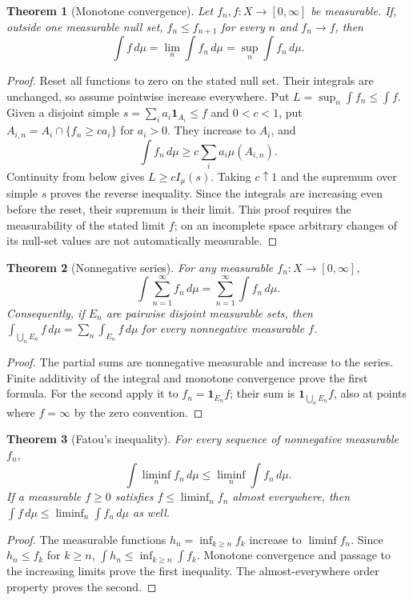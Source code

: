 \documentclass[11pt,oneside,openany]{book}
\newtheorem{theorem}{Theorem}[chapter]
\theoremstyle{definition}
\theoremstyle{remark}
\newcommand{\one}{\mathbf1}\newcommand{\ind}[1]{\mathbf1_{#1}}
\newcommand{\Eplus}{[0,\infty]}
\newcommand{\family}[1]{}
\begin{document}
\begin{theorem}[Monotone convergence]
\family{D11.05.monotone_convergence}\label{d11:05:monotone-convergence}
Let $f_n,f:X\to\Eplus$ be measurable. If, outside one measurable null
set, $f_n\leq f_{n+1}$ for every $n$ and $f_n\to f$, then
\[
 \int f\,d\mu=\lim_n\int f_n\,d\mu=\sup_n\int f_n\,d\mu.
\]
\end{theorem}
\begin{proof}
Reset all functions to zero on the stated null set. Their integrals are
unchanged, so assume pointwise increase everywhere. Put
$L=\sup_n\int f_n\leq\int f$. Given a disjoint simple
$s=\sum_i a_i\one_{A_i}\leq f$ and $0<c<1$, put
$A_{i,n}=A_i\cap\{f_n\geq ca_i\}$ for $a_i>0$.
They increase to $A_i$, and
\[
 \int f_n\,d\mu\geq c\sum_i a_i\mu(A_{i,n}).
\]
Continuity from below gives $L\geq cI_\mu(s)$. Taking $c\uparrow1$ and
the supremum over simple $s$ proves the reverse inequality. Since the
integrals are increasing even before the reset, their supremum is their
limit. This proof requires the measurability of the stated limit $f$;
on an incomplete space arbitrary changes of its null-set values are not
automatically measurable.
\end{proof}

\begin{theorem}[Nonnegative series]
\family{D11.05.beppo_levi}\label{d11:05:beppo-levi}
For any measurable $f_n:X\to\Eplus$,
\[
 \int\sum_{n=1}^\infty f_n\,d\mu
   =\sum_{n=1}^\infty\int f_n\,d\mu.
\]
Consequently, if $E_n$ are pairwise disjoint measurable sets, then
$\int_{\bigcup_nE_n}f\,d\mu=\sum_n\int_{E_n}f\,d\mu$ for every
nonnegative measurable $f$.
\end{theorem}
\begin{proof}
The partial sums are nonnegative measurable and increase to the series.
Finite additivity of the integral and monotone convergence prove the first
formula. For the second apply it to $f_n=\one_{E_n}f$; their sum is
$\one_{\bigcup_nE_n}f$, also at points where $f=\infty$ by the zero convention.
\end{proof}

\begin{theorem}[Fatou's inequality]
\family{D11.05.fatou}\label{d11:05:fatou}
For every sequence of nonnegative measurable $f_n$,
\[
 \int\liminf_n f_n\,d\mu\leq\liminf_n\int f_n\,d\mu.
\]
If a measurable $f\geq0$ satisfies $f\leq\liminf_n f_n$ almost everywhere,
then $\int f\,d\mu\leq\liminf_n\int f_n\,d\mu$ as well.
\end{theorem}
\begin{proof}
The measurable functions $h_n=\inf_{k\geq n}f_k$ increase to
$\liminf f_n$. Since $h_n\leq f_k$ for $k\geq n$,
$\int h_n\leq\inf_{k\geq n}\int f_k$. Monotone convergence and passage
to the increasing limits prove the first inequality. The almost-everywhere
order property proves the second.
\end{proof}
\end{document}
